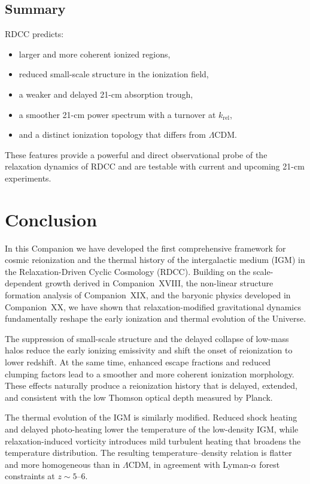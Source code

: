 \documentclass[11pt,a4paper]{article}
\begin{document}
\subsection{Summary}

RDCC predicts:
\begin{itemize}
\item larger and more coherent ionized regions,
\item reduced small-scale structure in the ionization field,
\item a weaker and delayed 21-cm absorption trough,
\item a smoother 21-cm power spectrum with a turnover at $k_{\mathrm{rel}}$,
\item and a distinct ionization topology that differs from $\Lambda$CDM.
\end{itemize}

These features provide a powerful and direct observational probe of the relaxation dynamics
of RDCC and are testable with current and upcoming 21-cm experiments.

\section{Conclusion}

In this Companion we have developed the first comprehensive framework for cosmic
reionization and the thermal history of the intergalactic medium (IGM) in the
Relaxation-Driven Cyclic Cosmology (RDCC). Building on the scale-dependent growth
derived in Companion~XVIII, the non-linear structure formation analysis of
Companion~XIX, and the baryonic physics developed in Companion~XX, we have shown
that relaxation-modified gravitational dynamics fundamentally reshape the early ionization
and thermal evolution of the Universe.

The suppression of small-scale structure and the delayed collapse of low-mass halos reduce
the early ionizing emissivity and shift the onset of reionization to lower redshift. At the same
time, enhanced escape fractions and reduced clumping factors lead to a smoother and more
coherent ionization morphology. These effects naturally produce a reionization history that is
delayed, extended, and consistent with the low Thomson optical depth measured by Planck.

The thermal evolution of the IGM is similarly modified. Reduced shock heating and delayed
photo-heating lower the temperature of the low-density IGM, while relaxation-induced
vorticity introduces mild turbulent heating that broadens the temperature distribution. The
resulting temperature–density relation is flatter and more homogeneous than in
$\Lambda$CDM, in agreement with Lyman-$\alpha$ forest constraints at $z \sim 5$–$6$.
\end{document}
